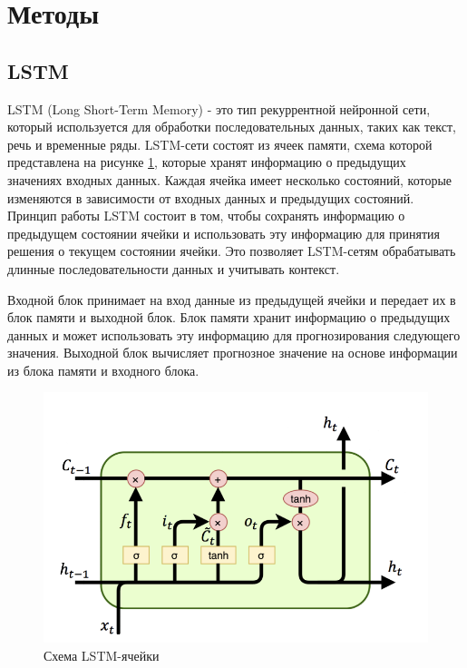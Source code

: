 \documentclass[diploma]{nanolab2015}
\begin{document}
\section{Методы}
\subsection{LSTM}
LSTM (Long Short-Term Memory) - это тип рекуррентной нейронной сети, который используется для обработки последовательных данных, таких как текст, речь и временные ряды. LSTM-сети состоят из ячеек памяти, схема которой представлена на рисунке \ref{pic1}, которые хранят информацию о предыдущих значениях входных данных. Каждая ячейка имеет несколько состояний, которые изменяются в зависимости от входных данных и предыдущих состояний.
Принцип работы LSTM состоит в том, чтобы сохранять информацию о предыдущем состоянии ячейки и использовать эту информацию для принятия решения о текущем состоянии ячейки. Это позволяет LSTM-сетям обрабатывать длинные последовательности данных и учитывать контекст\cite{book8}.

Входной блок принимает на вход данные из предыдущей ячейки и передает их в блок памяти и выходной блок. Блок памяти хранит информацию о предыдущих данных и может использовать эту информацию для прогнозирования следующего значения. Выходной блок вычисляет прогнозное значение на основе информации из блока памяти и входного блока.

\begin{figure}[ht]
    \centering
    \includegraphics[scale=0.7]{./assets/lstm-cell.png}
    \caption{Схема LSTM-ячейки}
    \label{pic1}
\end{figure}
\end{document}
